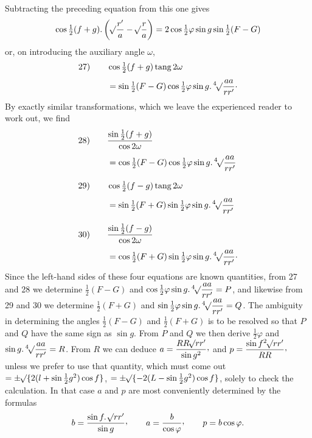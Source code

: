 Subtracting the preceding equation from this one gives
\[
\cos\tfrac12(f+g)\mathpunct{.}\left(\BareRoot{\dfrac{r'}{a}}-\BareRoot{\dfrac{r}{a}}\right)=2\cos\tfrac12\varphi\sin g\sin\tfrac12(F-G)
\]
or, on introducing the auxiliary angle $\omega$,
\[
\begin{aligned}
\mathrm{27)}\qquad &\cos\tfrac12(f+g)\operatorname{tang}2\omega\\[4pt]
&=\sin\tfrac12(F-G)\cos\tfrac12\varphi\sin g\mathpunct{.}\BareRoot[4]{\dfrac{aa}{rr'}}\mathpunct{\cdot}
\end{aligned}
\]
By exactly similar transformations, which we leave the experienced reader to work out, we find
\[
\begin{aligned}
\mathrm{28)}\qquad &\dfrac{\sin\frac12(f+g)}{\cos 2\omega}\\[4pt]
&=\cos\tfrac12(F-G)\cos\tfrac12\varphi\sin g\mathpunct{.}\BareRoot[4]{\dfrac{aa}{rr'}}\\[8pt]
\mathrm{29)}\qquad &\cos\tfrac12(f-g)\operatorname{tang}2\omega\\[4pt]
&=\sin\tfrac12(F+G)\sin\tfrac12\varphi\sin g\mathpunct{.}\BareRoot[4]{\dfrac{aa}{rr'}}\\[8pt]
\mathrm{30)}\qquad &\dfrac{\sin\frac12(f-g)}{\cos 2\omega}\\[4pt]
&=\cos\tfrac12(F+G)\sin\tfrac12\varphi\sin g\mathpunct{.}\BareRoot[4]{\dfrac{aa}{rr'}}\mathpunct{\cdot}
\end{aligned}
\]
Since the left-hand sides of these four equations are known quantities, from 27 and 28 we determine $\frac12(F-G)$ and $\cos\frac12\varphi\sin g\mathpunct{.}\BareRoot[4]{\dfrac{aa}{rr'}}=P$, and likewise from 29 and 30 we determine $\frac12(F+G)$ and $\sin\frac12\varphi\sin g\mathpunct{.}\BareRoot[4]{\dfrac{aa}{rr'}}=Q$. The ambiguity in determining the angles $\frac12(F-G)$ and $\frac12(F+G)$ is to be resolved so that $P$ and $Q$ have the same sign as $\sin g$. From $P$ and $Q$ we then derive $\frac12\varphi$ and $\sin g\mathpunct{.}\BareRoot[4]{\dfrac{aa}{rr'}}=R$. From $R$ we can deduce $a=\dfrac{RR\BareRoot{rr'}}{\sin g^2}\mathpunct{\raisebox{.45ex}{,}}$ and $p=\dfrac{\sin f^2\BareRoot{rr'}}{RR}\mathpunct{\raisebox{.45ex}{,}}$ unless we prefer to use that quantity, which must come out $=\pm\BareRoot{\{2(l+\sin\frac12 g^2)\cos f\}}$, $=\pm\BareRoot{\{-2(L-\sin\frac12 g^2)\cos f\}}$, solely to check the calculation. In that case $a$ and $p$ are most conveniently determined by the formulas
\[
b=\dfrac{\sin f\mathpunct{.}\BareRoot{rr'}}{\sin g}\mathpunct{\raisebox{.45ex}{,}}\qquad a=\dfrac{b}{\cos\varphi}\mathpunct{\raisebox{.45ex}{,}}\qquad p=b\cos\varphi.
\]
